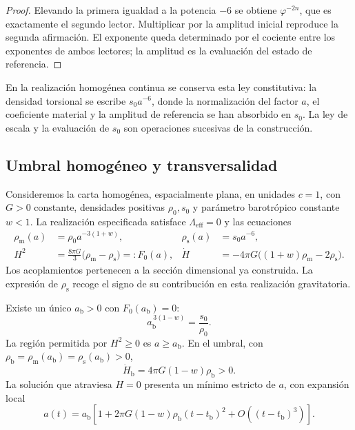 \begin{proof}
Elevando la primera igualdad a la potencia \(-6\) se obtiene
\(\varphi^{-2n}\), que es exactamente el segundo lector. Multiplicar
por la amplitud inicial reproduce la segunda afirmación. El exponente
queda determinado por el cociente entre los exponentes de ambos
lectores; la amplitud es la evaluación del estado de referencia.
\end{proof}

En la realización homogénea continua se conserva esta ley constitutiva:
la densidad torsional se escribe \(s_0a^{-6}\), donde la normalización
del factor \(a\), el coeficiente material y la amplitud de referencia
se han absorbido en \(s_0\). La ley de escala y la evaluación de
\(s_0\) son operaciones sucesivas de la construcción.

\subsection{Umbral homogéneo y transversalidad}
\label{vii:vii:sec:umbral-rebote}

Consideremos la carta homogénea, espacialmente plana, en unidades \(c=1\),
con \(G>0\) constante, densidades positivas \(\rho_0,s_0\) y parámetro
barotrópico constante \(w<1\). La realización especificada satisface
\(\Lambda_{\mathrm{eff}}=0\) y las ecuaciones
\begin{align}
 \rho_{\mathrm m}(a)&=\rho_0a^{-3(1+w)},&
 \rho_{\mathrm s}(a)&=s_0a^{-6},\\
 H^2&=\frac{8\pi G}{3}
        \bigl(\rho_{\mathrm m}-\rho_{\mathrm s}\bigr)
        =:F_0(a),&
 \dot H&=-4\pi G
        \bigl((1+w)\rho_{\mathrm m}-2\rho_{\mathrm s}\bigr).
 \label{vii:vii:eq:dinamica-homogenea}
\end{align}
Los acoplamientos pertenecen a la sección dimensional ya construida.
La expresión de \(\rho_{\mathrm s}\) recoge el signo de su contribución
en esta realización gravitatoria.

\begin{theorem}
\label{vii:vii:thm:rebote}
Existe un único \(a_{\mathrm b}>0\) con \(F_0(a_{\mathrm b})=0\):
\[
 a_{\mathrm b}^{\,3(1-w)}=\frac{s_0}{\rho_0}.
\]
La región permitida por \(H^2\geq0\) es \(a\geq a_{\mathrm b}\).
En el umbral, con
\(\rho_{\mathrm b}=\rho_{\mathrm m}(a_{\mathrm b})
                  =\rho_{\mathrm s}(a_{\mathrm b})>0\),
\[
 \dot H_{\mathrm b}=4\pi G(1-w)\rho_{\mathrm b}>0.
\]
La solución que atraviesa \(H=0\) presenta un mínimo estricto de \(a\),
con expansión local
\[
 a(t)=a_{\mathrm b}\left[
 1+2\pi G(1-w)\rho_{\mathrm b}(t-t_{\mathrm b})^2
 +O((t-t_{\mathrm b})^3)\right].
\]
\end{theorem}

